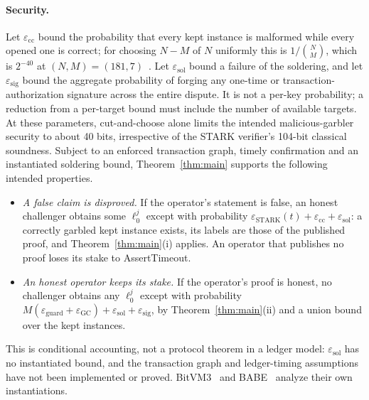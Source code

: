 \documentclass[11pt]{article}
\begin{document}
\paragraph{Security.} Let $\varepsilon_{\mathrm{cc}}$ bound the probability
that every kept instance is malformed while every opened one is correct; for
choosing $N-M$ of $N$ uniformly this is $1/\binom{N}{M}$, which is $2^{-40}$ at
$(N,M)=(181,7)$~\cite{babe2026}. Let $\varepsilon_{\mathrm{sol}}$ bound a failure of
the soldering, and let $\varepsilon_{\mathrm{sig}}$ bound the aggregate
probability of forging any one-time or transaction-authorization signature
across the entire dispute. It is not a per-key probability; a reduction from a
per-target bound must include the number of available targets. At these
parameters, cut-and-choose alone limits
the intended malicious-garbler security to about 40 bits, irrespective of the
STARK verifier's 104-bit classical soundness. Subject to an enforced transaction
graph, timely confirmation and an instantiated soldering bound,
Theorem~\ref{thm:main} supports the following intended properties.
\begin{itemize}
  \item \emph{A false claim is disproved.} If the operator's statement is false, an
    honest challenger obtains some $\ell^j_0$ except with probability
    $\varepsilon_{\mathrm{STARK}}(t)+\varepsilon_{\mathrm{cc}}+\varepsilon_{\mathrm{sol}}$:
    a correctly garbled kept instance exists, its labels are those of the published
    proof, and Theorem~\ref{thm:main}(i) applies. An operator that publishes no
    proof loses its stake to AssertTimeout.
  \item \emph{An honest operator keeps its stake.} If the operator's proof is
    honest, no challenger obtains any $\ell^j_0$ except with probability
    $M(\varepsilon_{\mathrm{guard}}+\varepsilon_{\mathrm{GC}})+\varepsilon_{\mathrm{sol}}+\varepsilon_{\mathrm{sig}}$,
    by Theorem~\ref{thm:main}(ii) and a union bound over the kept instances.
\end{itemize}
This is conditional accounting, not a protocol theorem in a ledger model:
$\varepsilon_{\mathrm{sol}}$ has no instantiated bound, and the transaction
graph and ledger-timing assumptions have not been implemented or proved.
BitVM3~\cite{bitvm3paper} and BABE~\cite{babe2026} analyze their own
instantiations.
\end{document}
